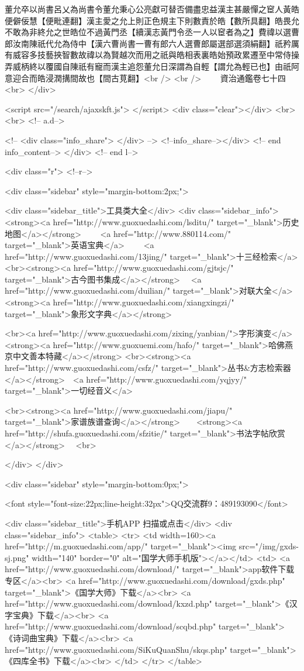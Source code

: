 董允卒以尚書呂乂為尚書令董允秉心公亮獻可替否備盡忠益漢主甚嚴憚之䆠人黃皓便僻佞慧【便毗連翻】漢主愛之允上則正色規主下則數責於皓【數所具翻】皓畏允不敢為非終允之世皓位不過黃門丞【續漢志黃門令丞一人以䆠者為之】費禕以選曹郎汝南陳祇代允為侍中【漢六曹尚書一曹有郎六人選曹郎屬選部選須絹翻】祇矜厲有威容多技藝挾智數故禕以為賢越次而用之祇與皓相表裏皓始預政累遷至中常侍操弄威柄終以覆國自陳祇有寵而漢主追怨董允日深謂為自輕【謂允為輕已也】由祇阿意迎合而皓浸潤搆間故也【間古莧翻】<br />
<br />
　　資治通鑑卷七十四  <br>
   </div> 

<script src="/search/ajaxskft.js"> </script>
 <div class="clear"></div>
<br>
<br>
 <!-- a.d-->

 <!--
<div class="info_share">
</div> 
-->
 <!--info_share--></div>   <!-- end info_content-->
  </div> <!-- end l-->

<div class="r">   <!--r-->



<div class="sidebar"  style="margin-bottom:2px;">

 
<div class="sidebar_title">工具类大全</div>
<div class="sidebar_info">
<strong><a href="http://www.guoxuedashi.com/lsditu/" target="_blank">历史地图</a></strong>　　
<a href="http://www.880114.com/" target="_blank">英语宝典</a>　　
<a href="http://www.guoxuedashi.com/13jing/" target="_blank">十三经检索</a>　
<br><strong><a href="http://www.guoxuedashi.com/gjtsjc/" target="_blank">古今图书集成</a></strong>　
<a href="http://www.guoxuedashi.com/duilian/" target="_blank">对联大全</a>　<strong><a href="http://www.guoxuedashi.com/xiangxingzi/" target="_blank">象形文字典</a></strong>　

<br><a href="http://www.guoxuedashi.com/zixing/yanbian/">字形演变</a>　　<strong><a href="http://www.guoxuemi.com/hafo/" target="_blank">哈佛燕京中文善本特藏</a></strong>
<br><strong><a href="http://www.guoxuedashi.com/csfz/" target="_blank">丛书&方志检索器</a></strong>　<a href="http://www.guoxuedashi.com/yqjyy/" target="_blank">一切经音义</a>　　

<br><strong><a href="http://www.guoxuedashi.com/jiapu/" target="_blank">家谱族谱查询</a></strong>　　<strong><a href="http://shufa.guoxuedashi.com/sfzitie/" target="_blank">书法字帖欣赏</a></strong>　
<br>

</div>
</div>


<div class="sidebar" style="margin-bottom:0px;">

<font style="font-size:22px;line-height:32px">QQ交流群9：489193090</font>


<div class="sidebar_title">手机APP 扫描或点击</div>
<div class="sidebar_info">
<table>
<tr>
	<td width=160><a href="http://m.guoxuedashi.com/app/" target="_blank"><img src="/img/gxds-sj.png" width="140"  border="0" alt="国学大师手机版"></a></td>
	<td>
<a href="http://www.guoxuedashi.com/download/" target="_blank">app软件下载专区</a><br>
<a href="http://www.guoxuedashi.com/download/gxds.php" target="_blank">《国学大师》下载</a><br>
<a href="http://www.guoxuedashi.com/download/kxzd.php" target="_blank">《汉字宝典》下载</a><br>
<a href="http://www.guoxuedashi.com/download/scqbd.php" target="_blank">《诗词曲宝典》下载</a><br>
<a href="http://www.guoxuedashi.com/SiKuQuanShu/skqs.php" target="_blank">《四库全书》下载</a><br>
</td>
</tr>
</table>

